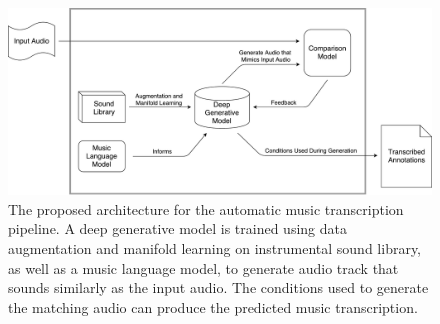 \begin{figure}
	\includegraphics[width=\textwidth]{grand.pdf}
	\caption{The proposed architecture for the automatic music transcription pipeline. A deep generative model is trained using data augmentation and manifold learning on instrumental sound library, as well as a music language model, to generate audio track that sounds similarly as the input audio. The conditions used to generate the matching audio can produce the predicted music transcription.}\label{fig:grand}
\end{figure}
